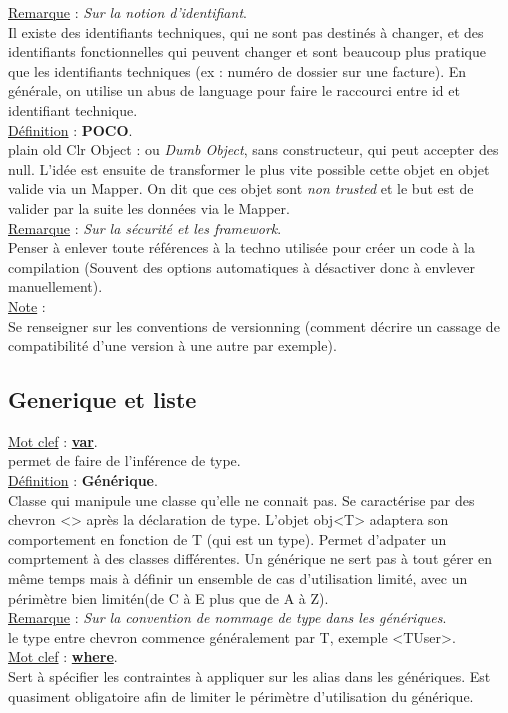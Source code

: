 \documentclass[a4paper,12pt,twoside]{article}
\newcommand{\urlcolor}{magenta}  %
\newcommand{\keycolor}{purple} %
\newcommand{\incode}[1]{{\footnotesize\ttfamily #1}} %
\newcommand{\rem}[2]{\noindent\underline{Remarque} : \textit{#1}.\\ \indent #2}
\newcommand{\note}[1]{\noindent\underline{Note} : \\ \indent #1}
\newcommand{\defi}[2]{\noindent\underline{Définition} : \textbf{#1}.\\ \indent #2}
\newcommand{\keyref}[2]{\hypersetup{urlcolor=\keycolor} \href{#1}{\textbf{#2}}\hypersetup{urlcolor=\urlcolor}}
\newcommand{\keyword}[3]{\noindent\underline{Mot clef} : \keyref{#1}{#2}. \\ \indent #3}
\begin{document}
\rem{Sur la notion d'identifiant}{Il existe des identifiants techniques, qui ne sont pas destinés à changer, et des identifiants fonctionnelles qui peuvent changer et sont beaucoup plus pratique que les identifiants techniques (ex : numéro de dossier sur une facture). En générale, on utilise un abus de language pour faire le raccourci entre \incode{id} et identifiant technique.}\\

\defi{POCO}{plain old Clr Object : ou \textit{Dumb Object}, sans constructeur, qui peut accepter des \incode{null}. L'idée est ensuite de transformer le plus vite possible cette objet en objet valide via un Mapper. On dit que ces objet sont \textit{non trusted} et le but est de valider par la suite les données via le Mapper.}\\

\rem{Sur la sécurité et les framework}{Penser à enlever toute références à la techno utilisée pour créer un code à la compilation (Souvent des options automatiques à désactiver donc à envlever manuellement).}\\

\note{Se renseigner sur les conventions de versionning (comment décrire un cassage de compatibilité d'une version à une autre par exemple).}\\

\subsection{Generique et liste}

\keyword{https://docs.microsoft.com/fr-fr/dotnet/csharp/language-reference/keywords/var}{var}{\incode{var} permet de faire de l'inférence de type.}\\

\defi{Générique}{Classe qui manipule une classe qu'elle ne connait pas. Se caractérise par des chevron <> après la déclaration de type. L'objet obj<T> adaptera son comportement en fonction de T (qui est un type). Permet d'adpater un comprtement à des classes différentes. Un générique ne sert pas à tout gérer en même temps mais à définir un ensemble de cas d'utilisation limité, avec un périmètre bien limitén(de C à E plus que de A à Z).}\\

\rem{Sur la convention de nommage de type dans les génériques}{le type entre chevron commence généralement par T, exemple <TUser>.}\\

\keyword{https://docs.microsoft.com/fr-fr/dotnet/csharp/language-reference/keywords/where-generic-type-constraint}{where}{Sert à spécifier les contraintes à appliquer sur les alias dans les génériques. Est quasiment obligatoire afin de limiter le périmètre d'utilisation du générique.}\\
\end{document}
